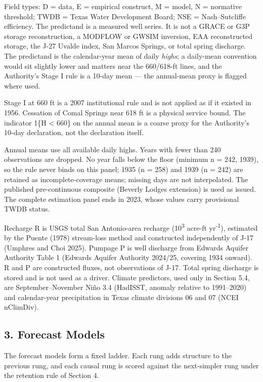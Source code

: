 \documentclass[11pt]{article}
\begin{document}
Field types: D = data, E = empirical construct, M = model, N = normative
threshold; TWDB = Texas Water Development Board; NSE = Nash--Sutcliffe
efficiency. The predictand is a measured well series. It is not a GRACE
or G3P storage reconstruction, a MODFLOW or GWSIM inversion, EAA
reconstructed storage, the J-27 Uvalde index, San Marcos Springs, or
total spring discharge. The predictand is the calendar-year mean of
daily \emph{highs}; a daily-mean convention would sit slightly lower and
matters near the 660/618-ft lines, and the Authority's Stage I rule is a
10-day mean --- the annual-mean proxy is flagged where used.

Stage I at 660 ft is a 2007 institutional rule and is not applied as if
it existed in 1956. Cessation of Comal Springs near 618 ft is a physical
service bound. The indicator 1\{H \textless{} 660\} on the annual mean
is a coarse proxy for the Authority's 10-day declaration, not the
declaration itself.

Annual means use all available daily highs. Years with fewer than 240
observations are dropped. No year falls below the floor (minimum n =
242, 1939), so the rule never binds on this panel; 1935 (n = 258) and
1939 (n = 242) are retained as incomplete-coverage means; missing days
are not interpolated. The published pre-continuous composite (Beverly
Lodges extension) is used as issued. The complete estimation panel ends
in 2023, whose values carry provisional TWDB status.

Recharge R is USGS total San Antonio-area recharge (10\textsuperscript{3} acre-ft yr\textsuperscript{-1}),
estimated by the Puente (1978) stream-loss method and constructed
independently of J-17 (Umphres and Choi 2025). Pumpage P is well
discharge from Edwards Aquifer Authority Table 1 (Edwards Aquifer
Authority 2024/25, covering 1934 onward). R and P are constructed
fluxes, not observations of J-17. Total spring discharge is stored and
is not used as a driver. Climate predictors, used only in Section 5.4,
are September--November Ni\~no 3.4 (HadISST, anomaly relative to
1991--2020) and calendar-year precipitation in Texas climate divisions
06 and 07 (NCEI nClimDiv).

\subsection{3. Forecast Models}\label{forecast-models}

The forecast models form a fixed ladder. Each rung adds structure to the
previous rung, and each causal rung is scored against the next-simpler
rung under the retention rule of Section 4.
\end{document}
